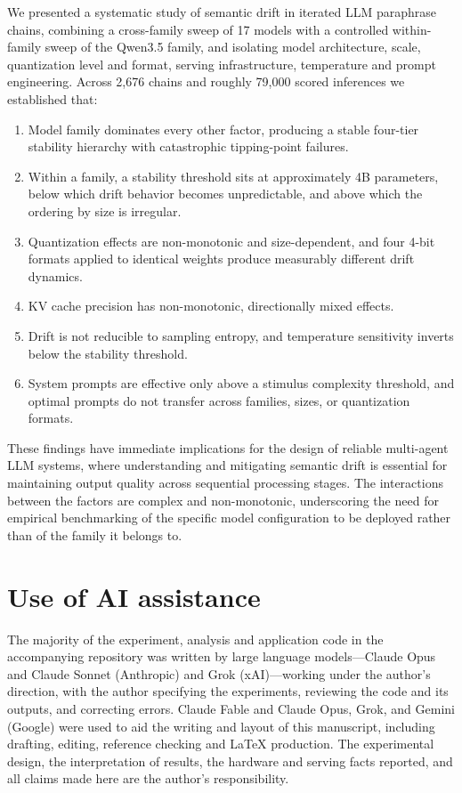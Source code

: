 \documentclass[11pt]{article}
\begin{document}
We presented a systematic study of semantic drift in iterated LLM paraphrase
chains, combining a cross-family sweep of 17 models with a controlled
within-family sweep of the Qwen3.5 family, and isolating model architecture,
scale, quantization level and format, serving infrastructure, temperature and
prompt engineering. Across 2{,}676 chains and roughly 79{,}000 scored
inferences we established that:

\begin{enumerate}[leftmargin=*]
  \item Model family dominates every other factor, producing a stable four-tier
        stability hierarchy with catastrophic tipping-point failures.
  \item Within a family, a stability threshold sits at approximately 4B
        parameters, below which drift behavior becomes unpredictable, and above
        which the ordering by size is irregular.
  \item Quantization effects are non-monotonic and size-dependent, and four
        4-bit formats applied to identical weights produce measurably different
        drift dynamics.
  \item KV cache precision has non-monotonic, directionally mixed effects.
  \item Drift is not reducible to sampling entropy, and temperature sensitivity
        inverts below the stability threshold.
  \item System prompts are effective only above a stimulus complexity
        threshold, and optimal prompts do not transfer across families, sizes,
        or quantization formats.
\end{enumerate}

These findings have immediate implications for the design of reliable multi-agent
LLM systems, where understanding and mitigating semantic drift is essential for
maintaining output quality across sequential processing stages. The interactions
between the factors are complex and non-monotonic, underscoring the need for
empirical benchmarking of the specific model configuration to be deployed rather
than of the family it belongs to.

\section*{Use of AI assistance}
\label{sec:ai-disclosure}
The majority of the experiment, analysis and application code in the
accompanying repository was written by large language models---Claude Opus
and Claude Sonnet (Anthropic) and Grok (xAI)---working under the author's
direction, with the author specifying the experiments, reviewing the code
and its outputs, and correcting errors. Claude Fable and Claude Opus, Grok,
and Gemini (Google) were used to aid the writing and layout of this
manuscript, including drafting, editing, reference checking and LaTeX
production. The experimental design, the interpretation of results, the
hardware and serving facts reported, and all claims made here are the
author's responsibility.
\end{document}
